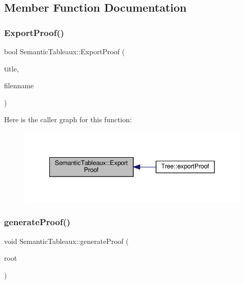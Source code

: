 \subsection{Member Function Documentation}
\mbox{\label{class_semantic_tableaux_a78039805239590cd2c8bc411158f2b2d}} 
\subsubsection{\texorpdfstring{Export\+Proof()}{ExportProof()}}
{\footnotesize\ttfamily bool Semantic\+Tableaux\+::\+Export\+Proof (\begin{DoxyParamCaption}\item[{string}]{title,  }\item[{string}]{filenname }\end{DoxyParamCaption})}

Here is the caller graph for this function\+:\nopagebreak
\begin{figure}[H]
\begin{center}
\leavevmode
\includegraphics[width=340pt]{d6/d22/class_semantic_tableaux_a78039805239590cd2c8bc411158f2b2d_icgraph}
\end{center}
\end{figure}
\mbox{\label{class_semantic_tableaux_ab41b0fa5d87d29ad807b410f18ce93a7}} 
\subsubsection{\texorpdfstring{generate\+Proof()}{generateProof()}}
{\footnotesize\ttfamily void Semantic\+Tableaux\+::generate\+Proof (\begin{DoxyParamCaption}\item[{shared\+\_\+ptr$<$ \hyperlink{class_s_t_node}{S\+T\+Node} $>$}]{root }\end{DoxyParamCaption})\hspace{0.3cm}{\ttfamily [private]}}

